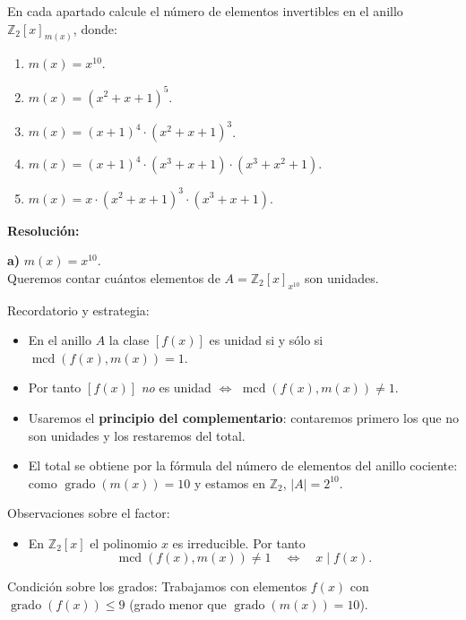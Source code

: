 \documentclass[a4paper,12pt]{article}
\begin{document}
\begin{ejercicio}[title=Ejercicio 10]
En cada apartado calcule el número de elementos invertibles en el anillo $\mathbb{Z}_2[x]_{m(x)}$, donde:

\begin{enumerate}
\item[a)] $m(x) = x^{10}$.
\item[b)] $m(x) = (x^2 + x + 1)^5$.
\item[c)] $m(x) = (x + 1)^4 \cdot (x^2 + x + 1)^3$.
\item[d)] $m(x) = (x + 1)^4 \cdot (x^3 + x + 1) \cdot (x^3 + x^2 + 1)$.
\item[e)] $m(x) = x \cdot (x^2 + x + 1)^3 \cdot (x^3 + x + 1)$.
\end{enumerate}

\tcblower
\textbf{Resolución:}

\textbf{a)} \quad $m(x)=x^{10}$. \\

Queremos contar cuántos elementos de $A=\mathbb{Z}_2[x]_{x^{10}}$ son unidades.

\vspace{0.5em}

Recordatorio y estrategia:
\begin{itemize}
\item En el anillo \(A\) la clase \([f(x)]\) es unidad si y sólo si \(\operatorname{mcd}(f(x),m(x))=1\).
\item Por tanto \([f(x)]\) \emph{no} es unidad \(\Longleftrightarrow\) \(\operatorname{mcd}(f(x),m(x))\neq 1\).
\item Usaremos el \textbf{principio del complementario}: contaremos primero los que no son unidades y los restaremos del total.
\item El total se obtiene por la fórmula del número de elementos del anillo cociente: como \(\operatorname{grado}(m(x))=10\) y estamos en \(\mathbb{Z}_2\), \(|A|=2^{10}\).
\end{itemize}

Observaciones sobre el factor:
\begin{itemize}
\item En \(\mathbb{Z}_2[x]\) el polinomio \(x\) es irreducible. Por tanto
\[
\operatorname{mcd}(f(x),m(x))\neq 1 \quad\Longleftrightarrow\quad x\mid f(x).
\]
\end{itemize}

Condición sobre los grados:
Trabajamos con elementos \(f(x)\) con \(\operatorname{grado}(f(x))\le 9\) (grado menor que \(\operatorname{grado}(m(x))=10\)).


\end{ejercicio}
\end{document}
